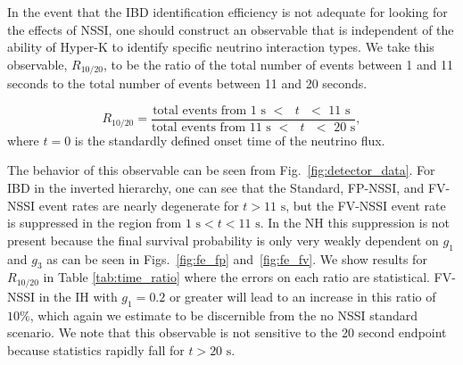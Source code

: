 \documentclass[a4paper,12pt]{article}
\begin{document}
In the event that the IBD identification efficiency is not adequate for looking for the effects of NSSI, one should construct an observable that is independent of the ability of Hyper-K to identify specific neutrino interaction types. We take this observable, $R_{\text{10/20}}$, to be the ratio of the total number of events between 1 and 11 seconds to the total number of events between 11 and 20 seconds. 

\begin{equation}
R_{\text{10/20}} = \frac{\text{total events from 1 s $<$ $t$ $<$ 11 s }}{\text{total events from 11 s $<$ $t$ $<$ 20 s}},
\label{eq:time_ratio_eq}
\end{equation}
where $t = 0$ is the standardly defined onset time of the neutrino flux.

The behavior of this observable can be seen from Fig.~\ref{fig:detector_data}. For IBD in the inverted hierarchy, one can see that the Standard, FP-NSSI, and FV-NSSI event rates are nearly degenerate for $t > 11\text{ s}$, but the FV-NSSI event rate is suppressed in the region from $1\text{ s} < t < 11\text{ s}$. In the NH this suppression is not present because the final survival probability is only very weakly dependent on $g_{1}$ and $g_{3}$ as can be seen in Figs.~\ref{fig:fe_fp} and~\ref{fig:fe_fv}. We show results for $R_{\text{10/20}}$ in Table \ref{tab:time_ratio} where the errors on each ratio are statistical. FV-NSSI in the IH with $g_{1} = 0.2$ or greater will lead to an increase in this ratio of $10\%$, which again we estimate to be discernible from the no NSSI standard scenario. We note that this observable is not sensitive to the 20 second endpoint because statistics rapidly fall for $t > 20\text{ s}$.

\begin{table}[t]
\caption*{$R_{\text{10/20}}\times 100\%$}
\centering
{}
\caption{$R_{\text{10/20}}$\eqref{eq:time_ratio_eq}, the ratio of total events detected during $1\text{ s} < t < 11\text{ s}$ in to those detected during  $11\text{ s} < t < 20\text{ s}$ for both NH and IH cases. This ratio provides a largely model-independent signature for NSSI modifications that is independent of Hyper-K's ability to identify the neutrino interaction type. In this case, there is a significant difference between flavor-violating NSSI and flavor-preserving NSSI/standard in the IH case.}
\label{tab:time_ratio}
\end{table}
\end{document}
